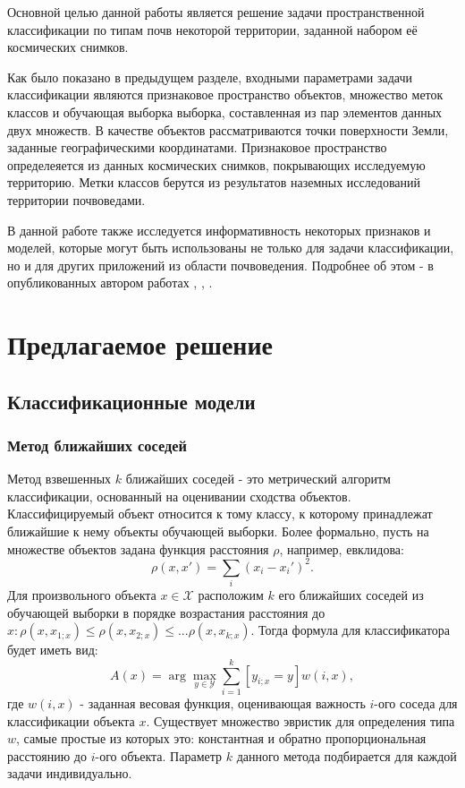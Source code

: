 \documentclass[14pt]{extarticle}
\begin{document}
\par
Основной целью данной работы является решение задачи пространственной классификации
по типам почв некоторой территории, заданной набором её космических снимков.
\par
Как было показано в предыдущем разделе, входными параметрами задачи классификации являются
признаковое пространство объектов, множество меток классов и обучающая выборка выборка,
составленная из пар элементов данных двух множеств. В качестве объектов рассматриваются точки
поверхности Земли, заданные географическими координатами. Признаковое пространство определеяется
из данных космических снимков, покрывающих исследуемую территорию. Метки классов берутся
из результатов наземных исследований территории почвоведами.
\par
В данной работе также исследуется информативность некоторых признаков и моделей, 
которые могут быть использованы не только для задачи классификации, 
но и для других приложений из области почвоведения. 
Подробнее об этом - в опубликованных автором работах \cite{rukhovich-1}, \cite{rukhovich-2},
\cite{rukhovich-3}.

\section{Предлагаемое решение}

\subsection{Классификационные модели}

\subsubsection{Метод ближайших соседей}

\par
Метод взвешенных $k$ ближайших соседей - это метрический алгоритм классификации,
основанный на оценивании сходства объектов. Классифицируемый объект относится к тому классу,
к которому принадлежат ближайшие к нему объекты обучающей выборки. Более формально,
пусть на множестве объектов задана функция расстояния $\rho$, например, евклидова:
\[
    \rho(x, x') = \sum_i (x_i - x_i')^2.
\]
Для произвольного объекта $x \in \mathcal{X}$ расположим $k$ его ближайших соседей
из обучающей выборки в порядке возрастания расстояния до 
$x: \rho(x, x_{1;x}) \le \rho(x, x_{2;x}) \le ... \rho(x, x_{k;x})$.
Тогда формула для классификатора будет иметь вид:
\[
    A(x)=\arg\max_{y\in\mathcal{Y}} \sum_{i=1}^k[y_{i;x}=y]w(i, x),
\]
где $w(i, x)$ - заданная весовая функция, оценивающая важность $i$-ого соседа для
классификации объекта $x$. Существует множество эвристик для определения типа $w$,
самые простые из которых это: константная и обратно пропорциональная расстоянию до $i$-ого
объекта. Параметр $k$ данного метода подбирается для каждой задачи индивидуально.
\end{document}

